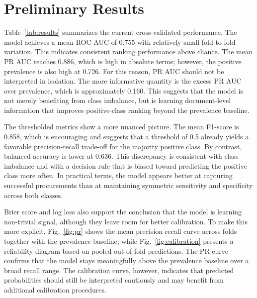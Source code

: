 \documentclass[conference]{IEEEtran}
\begin{document}
\section{Preliminary Results}
Table~\ref{tab:results} summarizes the current cross-validated performance. The model achieves a mean ROC AUC of 0.755 with relatively small fold-to-fold variation. This indicates consistent ranking performance above chance. The mean PR AUC reaches 0.886, which is high in absolute terms; however, the positive prevalence is also high at 0.726. For this reason, PR AUC should not be interpreted in isolation. The more informative quantity is the excess PR AUC over prevalence, which is approximately 0.160. This suggests that the model is not merely benefiting from class imbalance, but is learning document-level information that improves positive-class ranking beyond the prevalence baseline.

The thresholded metrics show a more nuanced picture. The mean F1-score is 0.858, which is encouraging and suggests that a threshold of 0.5 already yields a favorable precision-recall trade-off for the majority positive class. By contrast, balanced accuracy is lower at 0.636. This discrepancy is consistent with class imbalance and with a decision rule that is biased toward predicting the positive class more often. In practical terms, the model appears better at capturing successful procurements than at maintaining symmetric sensitivity and specificity across both classes.

Brier score and log loss also support the conclusion that the model is learning non-trivial signal, although they leave room for better calibration. To make this more explicit, Fig.~\ref{fig:pr} shows the mean precision-recall curve across folds together with the prevalence baseline, while Fig.~\ref{fig:calibration} presents a reliability diagram based on pooled out-of-fold predictions. The PR curve confirms that the model stays meaningfully above the prevalence baseline over a broad recall range. The calibration curve, however, indicates that predicted probabilities should still be interpreted cautiously and may benefit from additional calibration procedures.
\end{document}
